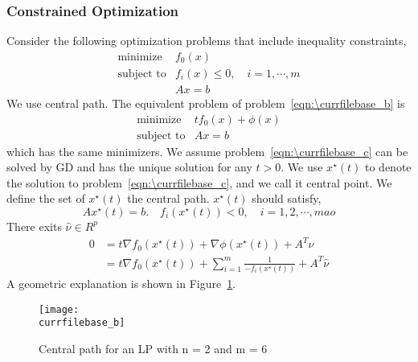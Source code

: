 \documentclass[catalog.tex]{subfiles}
\begin{document}
\subsubsection{Constrained Optimization}
Consider the following optimization problems that include inequality constraints, 
\begin{equation}
\label{eqn:\currfilebase_b}
\begin{array}{ll}
\mbox{minimize}   & f_0(x) \\
\mbox{subject to} & f_i(x)\leq 0,\quad i=1,\cdots,m\\
&Ax=b
\end{array}
\end{equation}
We use central path. The equivalent problem of problem~\ref{eqn:\currfilebase_b} is
\begin{equation}
\label{eqn:\currfilebase_c}
\begin{array}{ll}
\mbox{minimize}   & t f_0(x)+\phi(x) \\
\mbox{subject to} & Ax=b
\end{array}
\end{equation}
which has the same minimizers. We assume problem~\ref{eqn:\currfilebase_c} can be solved by GD and has the unique solution for any $t>0$. We use $x^\star(t)$ to denote the solution to problem~\ref{eqn:\currfilebase_c}, and we call it central point. We define the set of $x^\star(t)$ the central path. $x^\star(t)$ should satisfy,
\begin{equation}
Ax^\star(t) = b. \quad f_i(x^\star(t)) < 0, \quad i=1,2,\cdots, mao
\end{equation}
There exits $\hat{\nu}\in R^p$
\begin{align}
\label{eqn:\currfilebase_d}
0 &=t\nabla f_0(x^\star(t)) + \nabla\phi(x^\star(t)) + A^T\hat{\nu}\\
&=t\nabla f_0(x^\star(t)) + \sum_{i=1}^m\frac{1}{-f_i(x^\star(t))} + A^T\hat{\nu}
\end{align}
A geometric explanation is shown in Figure~\ref{fig:\currfilebase_b}.
\begin{figure}[!htb]
\centering
\texttt{[image: \\currfilebase\_b]}
	\caption{Central path for an LP with n = 2 and m = 6}
	\label{fig:\currfilebase_b}
\end{figure}
\end{document}
